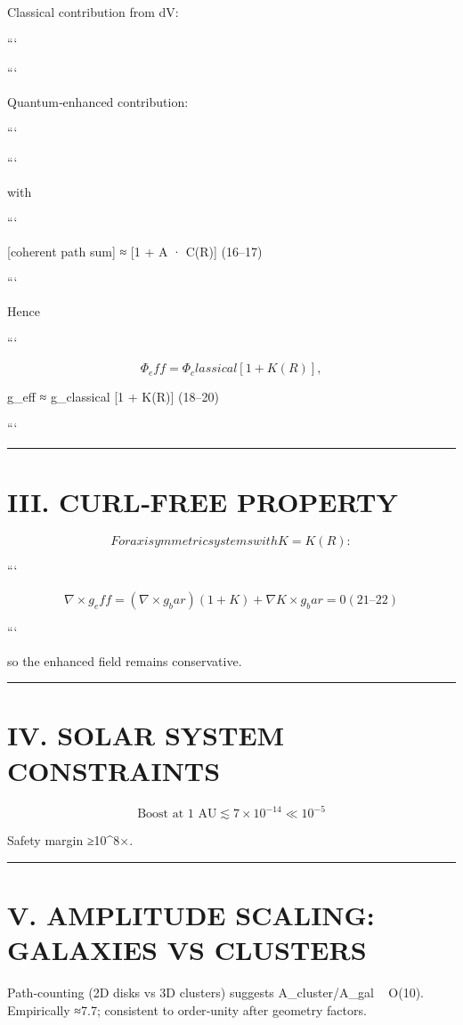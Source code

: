 \documentclass[11pt,a4paper]{article}
\begin{document}
Classical contribution from dV:

```

```

Quantum‑enhanced contribution:

```

```

with

```

[coherent path sum] ≈ [1 + A · C(R)]     (16–17)

```

Hence

```

\[
Φ_eff = Φ_classical [1 + K(R)],
\]

 g\_eff ≈ g\_classical [1 + K(R)]     (18–20)

```


\medskip\hrule\medskip


\section{III. CURL‑FREE PROPERTY}


\[
For axisymmetric systems with K=K(R):
\]

```

\[
∇ × g_eff = (∇ × g_bar)(1+K) + ∇K × g_bar = 0     (21–22)
\]

```

so the enhanced field remains conservative.


\medskip\hrule\medskip


\section{IV. SOLAR SYSTEM CONSTRAINTS}


\begin{equation}
\text{Boost at 1 AU} \lesssim 7\times 10^{-14} \ll 10^{-5}
\end{equation}

Safety margin ≥10^8×.


\medskip\hrule\medskip


\section{V. AMPLITUDE SCALING: GALAXIES VS CLUSTERS}


Path‑counting (2D disks vs 3D clusters) suggests A\_cluster/A\_gal ~ O(10). Empirically ≈7.7; consistent to order‑unity after geometry factors.
\end{document}

